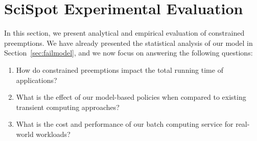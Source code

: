 \vspace*{\subsecspace}
\section{SciSpot Experimental Evaluation}
\label{sec:eval}

%


In this section, we present analytical and empirical evaluation of constrained preemptions.
We have already presented the statistical analysis of our model in Section~\ref{sec:failmodel}, and we now focus on answering the following questions: 

\begin{enumerate}
\item How do constrained preemptions impact the total running time of applications?

\item  What is the effect of our model-based policies when compared to existing transient computing approaches?


\item What is the cost and performance of our batch computing service for real-world workloads? 
  
\end{enumerate}


